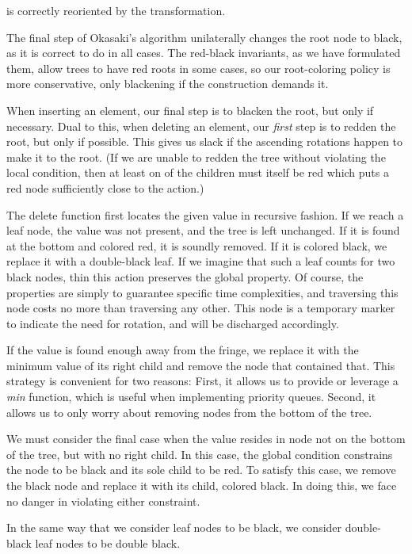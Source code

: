 \documentclass[preprint]{sigplanconf}
\begin{document}
is correctly reoriented by the transformation.

The final step of Okasaki's algorithm unilaterally changes the root node to black, as it is correct to do in all cases. The red-black invariants, as we have formulated them, allow trees to have red roots in some cases, so our root-coloring policy is more conservative, only blackening if the construction demands it.

When inserting an element, our final step is to blacken the root, but only if necessary. Dual to this, when deleting an element, our \emph{first} step is to redden the root, but only if possible. This gives us slack if the ascending rotations happen to make it to the root. (If we are unable to redden the tree without violating the local condition, then at least on of the children must itself be red which puts a red node sufficiently close to the action.)

The delete function first locates the given value in recursive fashion. If we reach a leaf node, the value was not present, and the tree is left unchanged. If it is found at the bottom and colored red, it is soundly removed. If it is colored black, we replace it with a double-black leaf. If we imagine that such a leaf counts for two black nodes, thin this action preserves the global property. Of course, the properties are simply to guarantee specific time complexities, and traversing this node costs no more than traversing any other. This node is a temporary marker to indicate the need for rotation, and will be discharged accordingly.

If the value is found enough away from the fringe, we replace it with the minimum value of its right child and remove the node that contained that. This strategy is convenient for two reasons: First, it allows us to provide or leverage a \emph{min} function, which is useful when implementing priority queues. Second, it allows us to only worry about removing nodes from the bottom of the tree.

We must consider the final case when the value resides in node not on the bottom of the tree, but with no right child. In this case, the global condition constrains the node to be black and its sole child to be red. To satisfy this case, we remove the black node and replace it with its child, colored black. In doing this, we face no danger in violating either constraint.

In the same way that we consider leaf nodes to be black, we consider double-black leaf nodes to be double black.
\end{document}
